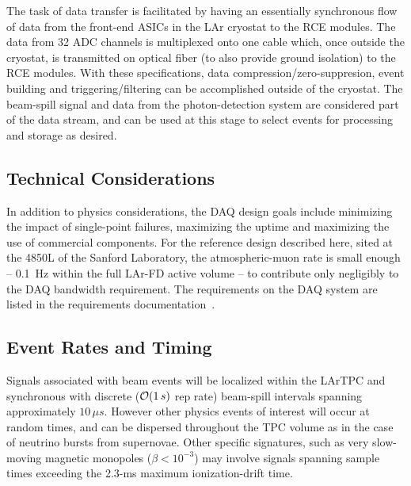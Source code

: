The task of data transfer is facilitated by having an essentially
synchronous flow of data from the front-end ASICs in the LAr cryostat
to the RCE modules.  The data from 32 ADC channels is multiplexed onto
one cable which, once outside the cryostat, is transmitted on optical
fiber (to also provide ground isolation) to the RCE modules.  With
these specifications, data compression/zero-suppresion, event building
and triggering/filtering can be accomplished outside of the cryostat.
The \LBNE beam-spill signal and data from the photon-detection system
are considered part of the data stream, and can be used at this stage
to select events for processing and storage as desired.

\subsection{Technical Considerations}
In addition to physics considerations, the DAQ design goals include  
minimizing the impact of single-point failures, maximizing the uptime and maximizing 
the use of commercial components.  
For the reference design described here, sited at the 4850L of the Sanford Laboratory, the 
atmospheric-muon rate is small enough -- 0.1~Hz within the full LAr-FD active 
volume -- to contribute only negligibly to the DAQ bandwidth requirement.
The requirements on the DAQ system are listed in the
requirements documentation~\cite{lar-fd-req}.





\subsection{Event Rates and Timing}
\label{sec:v5-daq-assumptions}


Signals associated with beam events will be localized within the 
LArTPC and synchronous with discrete (${\cal O}(1\,s)$ rep rate) 
beam-spill intervals spanning 
approximately $10\,\mu s$.  
However other physics events of interest will occur at random 
times, and can be dispersed throughout the TPC volume as in the case 
of neutrino bursts from supernovae.  Other specific signatures, such 
as very slow-moving magnetic monopoles ($\beta < 10^{-3}$) may involve 
signals spanning sample times exceeding the 2.3-ms maximum ionization-drift time.  

